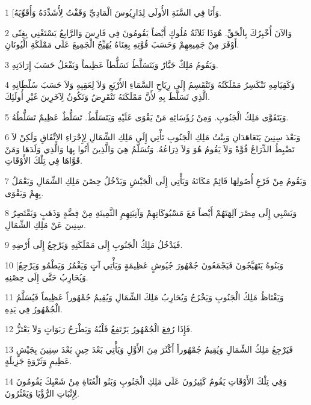 \par 1 [وَأَنَا فِي السَّنَةِ الأُولَى لِدَارِيُوسَ الْمَادِيِّ وَقَفْتُ لِأُشَدِّدَهُ وَأُقَوِّيَهُ.
\par 2 وَالآنَ أُخْبِرُكَ بِالْحَقِّ. هُوَذَا ثَلاَثَةُ مُلُوكٍ أَيْضاً يَقُومُونَ فِي فَارِسَ وَالرَّابِعُ يَسْتَغْنِي بِغِنًى أَوْفَرَ مِنْ جَمِيعِهِمْ وَحَسَبَ قُوَّتِهِ بِغِنَاهُ يُهَيِّجُ الْجَمِيعَ عَلَى مَمْلَكَةِ الْيُونَانِ.
\par 3 وَيَقُومُ مَلِكٌ جَبَّارٌ وَيَتَسَلَّطُ تَسَلُّطاً عَظِيماً وَيَفْعَلُ حَسَبَ إِرَادَتِهِ.
\par 4 وَكَقِيَامِهِ تَنْكَسِرُ مَمْلَكَتُهُ وَتَنْقَسِمُ إِلَى رِيَاحِ السَّمَاءِ الأَرْبَعِ وَلاَ لِعَقِبِهِ وَلاَ حَسَبَ سُلْطَانِهِ الَّذِي تَسَلَّطَ بِهِ لأَنَّ مَمْلَكَتَهُ تَنْقَرِضُ وَتَكُونُ لِآخَرِينَ غَيْرِ أُولَئِكَ.
\par 5 وَيَتَقَوَّى مَلِكُ الْجَنُوبِ. وَمِنْ رُؤَسَائِهِ مَنْ يَقْوَى عَلَيْهِ وَيَتَسَلَّطُ. تَسَلُّطٌ عَظِيمٌ تَسَلُّطُهُ.
\par 6 وَبَعْدَ سِنِينَ يَتَعَاهَدَانِ وَبِنْتُ مَلِكِ الْجَنُوبِ تَأْتِي إِلَى مَلِكِ الشِّمَالِ لِإِجْرَاءِ الاِتِّفَاقِ وَلَكِنْ لاَ تَضْبِطُ الذِّرَاعُ قُوَّةً وَلاَ يَقُومُ هُوَ وَلاَ ذِرَاعُهُ. وَتُسَلَّمُ هِيَ وَالَّذِينَ أَتُوا بِهَا وَالَّذِي وَلَدَهَا وَمَنْ قَوَّاهَا فِي تِلْكَ الأَوْقَاتِ.
\par 7 وَيَقُومُ مِنْ فَرْعِ أُصُولِهَا قَائِمٌ مَكَانَهُ وَيَأْتِي إِلَى الْجَيْشِ وَيَدْخُلُ حِصْنَ مَلِكِ الشِّمَالِ وَيَعْمَلُ بِهِمْ وَيَقْوَى.
\par 8 وَيَسْبِي إِلَى مِصْرَ آلِهَتَهُمْ أَيْضاً مَعَ مَسْبُوكَاتِهِمْ وَآنِيَتِهِمِ الثَّمِينَةِ مِنْ فِضَّةٍ وَذَهَبٍ وَيَقْتَصِرُ سِنِينَ عَنْ مَلِكِ الشِّمَالِ.
\par 9 فَيَدْخُلُ مَلِكُ الْجَنُوبِ إِلَى مَمْلَكَتِهِ وَيَرْجِعُ إِلَى أَرْضِهِ.
\par 10 [وَبَنُوهُ يَتَهَيَّجُونَ فَيَجْمَعُونَ جُمْهُورَ جُيُوشٍ عَظِيمَةٍ وَيَأْتِي آتٍ وَيَغْمُرُ وَيَطْمُو وَيَرْجِعُ وَيُحَارِبُ حَتَّى إِلَى حِصْنِهِ.
\par 11 وَيَغْتَاظُ مَلِكُ الْجَنُوبِ وَيَخْرُجُ وَيُحَارِبُ مَلِكَ الشِّمَالِ وَيُقِيمُ جُمْهُوراً عَظِيماً فَيُسَلَّمُ الْجُمْهُورُ فِي يَدِهِ.
\par 12 فَإِذَا رُفِعَ الْجُمْهُورُ يَرْتَفِعُ قَلْبُهُ وَيَطْرَحُ رَبَوَاتٍ وَلاَ يَعْتَزُّ.
\par 13 فَيَرْجِعُ مَلِكُ الشِّمَالِ وَيُقِيمُ جُمْهُوراً أَكْثَرَ مِنَ الأَوَّلِ وَيَأْتِي بَعْدَ حِينٍ بَعْدَ سِنِينَ بِجَيْشٍ عَظِيمٍ وَثَرْوَةٍ جَزِيلَةٍ.
\par 14 وَفِي تِلْكَ الأَوْقَاتِ يَقُومُ كَثِيرُونَ عَلَى مَلِكِ الْجَنُوبِ وَبَنُو الْعُتَاةِ مِنْ شَعْبِكَ يَقُومُونَ لِإِثْبَاتِ الرُّؤْيَا وَيَعْثُرُونَ.

